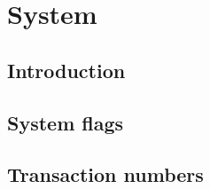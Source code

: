 
\section{System}
\subsection{Introduction}               \label{hub: system: intro}               
\subsection{System flags}               \label{hub: system: system flags}        
\subsection{Transaction numbers}        \label{hub: system: transaction numbers} 
